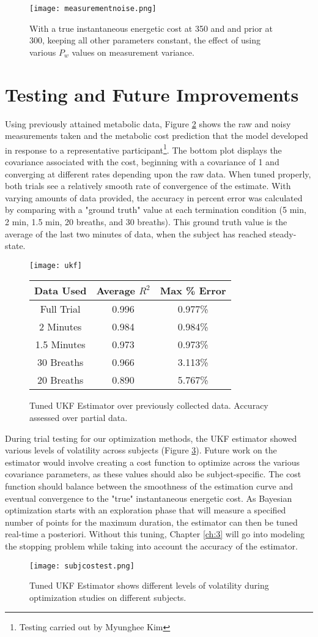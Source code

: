 \begin{figure}[t]
\centering
\texttt{[image: measurementnoise.png]}
\caption{With a true instantaneous energetic cost at 350 and and prior at 300, keeping all other parameters constant, the effect of using various $P_w$ values on measurement variance.}
\label{fig:measurementnoise}
\end{figure}

\section{Testing and Future Improvements}
Using previously attained metabolic data, Figure \ref{fig:ukftuned} shows the raw and noisy measurements taken and the metabolic cost prediction that the model developed in response to a representative participant\footnote{Testing carried out by Myunghee Kim}. The bottom plot displays the covariance associated with the cost, beginning with a covariance of 1 and converging at different rates depending upon the raw data. When tuned properly, both trials see a relatively smooth rate of convergence of the estimate. With varying amounts of data provided, the accuracy in percent error was calculated by comparing with a "ground truth" value at each termination condition (5 min, 2 min, 1.5 min, 20 breaths, and 30 breaths). This ground truth value is the average of the last two minutes of data, when the subject has reached steady-state.

\begin{figure}[!ht]
\centering
\texttt{[image: ukf]}

\begin{tabular}{ |c|c|c| } 
 \hline
 Data Used & Average $R^2$ & Max \% Error \\ 
 \hline
 Full Trial & 0.996 & 0.977\% \\ 
 2 Minutes & 0.984 & 0.984\% \\ 
 1.5 Minutes & 0.973 & 0.973\% \\ 
 30 Breaths & 0.966 & 3.113\% \\ 
 20 Breaths & 0.890 & 5.767\% \\ 
 \hline
\end{tabular}%
\caption{Tuned UKF Estimator over previously collected data. Accuracy assessed over partial data.}
\label{fig:ukftuned}
\end{figure}

During trial testing for our optimization methods, the UKF estimator showed various levels of volatility across subjects (Figure \ref{fig:subjcostest}). Future work on the estimator would involve creating a cost function to optimize across the various covariance parameters, as these values should also be subject-specific. The cost function should balance between the smoothness of the estimation curve and eventual convergence to the "true" instantaneous energetic cost. As Bayesian optimization starts with an exploration phase that will measure a specified number of points for the maximum duration, the estimator can then be tuned real-time a posteriori. Without this tuning, Chapter \ref{ch:3} will go into modeling the stopping problem while taking into account the accuracy of the estimator. 

\begin{figure}[t]
\centering
\texttt{[image: subjcostest.png]}
\caption{Tuned UKF Estimator shows different levels of volatility during optimization studies on different subjects.}
\label{fig:subjcostest}
\end{figure}